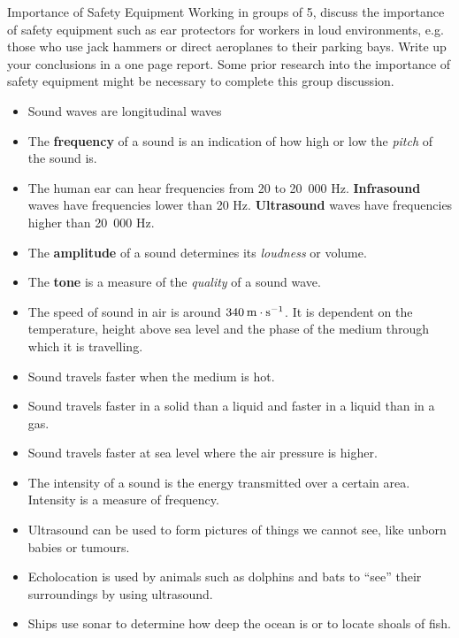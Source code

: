 \begin{groupdiscussion}{Importance of Safety Equipment }
\label{m38800*id185111}Working in groups of 5, discuss the importance of safety equipment such as ear protectors for workers in loud environments, e.g.\@{} those who use jack hammers or direct aeroplanes to their parking bays. Write up your conclusions in a one page report. Some prior research into the importance of safety equipment might be necessary to complete this group discussion. 
\end{groupdiscussion} 
            \nopagebreak
      \label{m38800*id185628}\begin{itemize}[noitemsep ] 
            \label{m38800*uid14}\item Sound waves are longitudinal waves
\label{m38800*uid15}\item The \textbf{frequency} of a sound is an indication of how high or low the \textsl{pitch} of the sound is.
\label{m38800*uid16}\item The human ear can hear frequencies from 20 to 20~000 Hz.
\textbf{Infrasound} waves have frequencies lower than 20 Hz.
\textbf{Ultrasound} waves have frequencies higher than 20~000 Hz.
\label{m38800*uid17}\item The \textbf{amplitude} of a sound determines its \textsl{loudness} or volume.
\label{m38800*uid18}\item The \textbf{tone} is a measure of the \textsl{quality} of a sound wave.
\label{m38800*uid19}\item The speed of sound in air is around $340\phantom{\rule{2pt}{0ex}}\text{m}\ensuremath{\cdot}\text{s}{}^{-1}$. It is dependent on the temperature, height above sea level and the phase of the medium through which it is travelling.
\label{m38800*uid20}\item Sound travels faster when the medium is hot.
\label{m38800*uid21}\item Sound travels faster in a solid than a liquid and faster in a liquid than in a gas.
\label{m38800*uid22}\item Sound travels faster at sea level where the air pressure is higher.
\label{m38800*uid23}\item The intensity of a sound is the energy transmitted over a certain area. Intensity is a measure of frequency.
\label{m38800*uid24}\item Ultrasound can be used to form pictures of things we cannot see, like unborn babies or tumours.
\label{m38800*uid25}\item Echolocation is used by animals such as dolphins and bats to ``see'' their surroundings by using ultrasound.
\label{m38800*uid26}\item Ships use sonar to determine how deep the ocean is or to locate shoals of fish.
\end{itemize}

